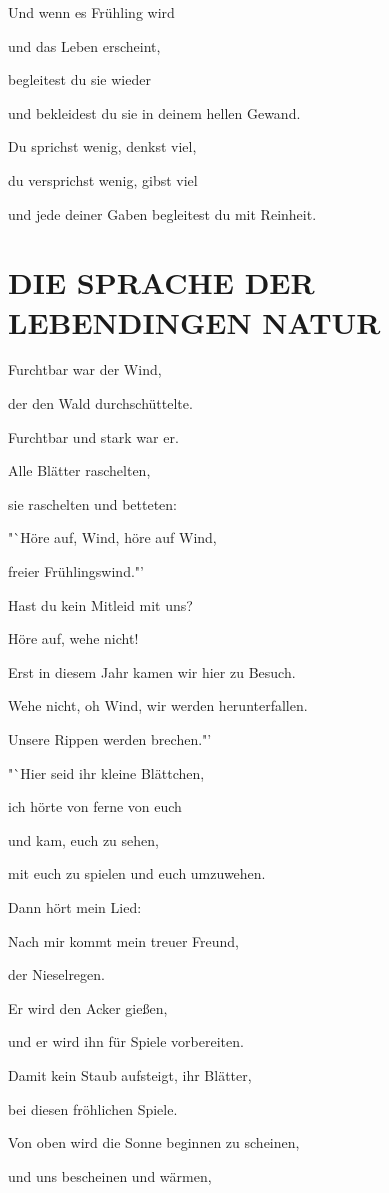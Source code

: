 \documentclass[11pt,a5paper,twoside]{article}
\begin{document}
Und wenn es Frühling wird

und das Leben erscheint,

begleitest du sie wieder 

und bekleidest du sie in deinem hellen Gewand.

Du sprichst wenig, denkst viel,

du versprichst wenig, gibst viel 

und jede deiner Gaben begleitest du mit Reinheit. 

\section[Die Sprache der lebendigen Natur]{DIE SPRACHE DER LEBENDINGEN NATUR}

Furchtbar war der Wind,

der den Wald durchschüttelte.

Furchtbar und stark war er.

Alle Blätter raschelten,

sie raschelten und betteten:

"`Höre auf, Wind, höre auf Wind,

freier Frühlingswind."'

Hast du kein Mitleid mit uns?

Höre auf, wehe nicht!

Erst in diesem Jahr kamen wir hier zu Besuch.

Wehe nicht, oh Wind, wir werden herunterfallen.

Unsere Rippen werden brechen."'

"`Hier seid ihr kleine Blättchen, 

ich hörte von ferne von euch

und kam, euch zu sehen,

mit euch zu spielen und euch umzuwehen.

Dann hört mein Lied:

Nach mir kommt mein treuer Freund,

der Nieselregen.

Er wird den Acker gießen,

und er wird ihn für Spiele vorbereiten.

Damit kein Staub aufsteigt, ihr Blätter,

bei diesen fröhlichen Spiele.

Von oben wird die Sonne beginnen zu scheinen,

und uns bescheinen und wärmen,
\end{document}
